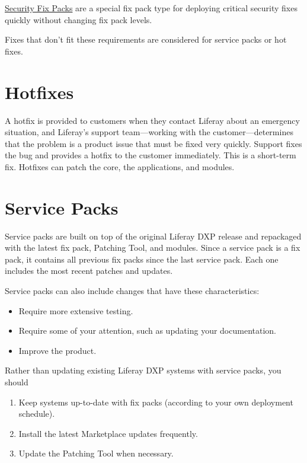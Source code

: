 \href{https://help.liferay.com/hc/en-us/articles/360035038331}{Security
Fix Packs} are a special fix pack type for deploying critical security
fixes quickly without changing fix pack levels.

Fixes that don't fit these requirements are considered for service packs
or hot fixes.

\section{Hotfixes}\label{hotfixes}

A hotfix is provided to customers when they contact Liferay about an
emergency situation, and Liferay's support team---working with the
customer---determines that the problem is a product issue that must be
fixed very quickly. Support fixes the bug and provides a hotfix to the
customer immediately. This is a short-term fix. Hotfixes can patch the
core, the applications, and modules.

\section{Service Packs}\label{service-packs}

Service packs are built on top of the original Liferay DXP release and
repackaged with the latest fix pack, Patching Tool, and modules. Since a
service pack is a fix pack, it contains all previous fix packs since the
last service pack. Each one includes the most recent patches and
updates.

Service packs can also include changes that have these characteristics:

\begin{itemize}
\tightlist
\item
  Require more extensive testing.
\item
  Require some of your attention, such as updating your documentation.
\item
  Improve the product.
\end{itemize}

Rather than updating existing Liferay DXP systems with service packs,
you should

\begin{enumerate}
\def\labelenumi{\arabic{enumi}.}
\item
  Keep systems up-to-date with fix packs (according to your own
  deployment schedule).
\item
  Install the latest Marketplace updates frequently.
\item
  Update the Patching Tool when necessary.
\end{enumerate}

